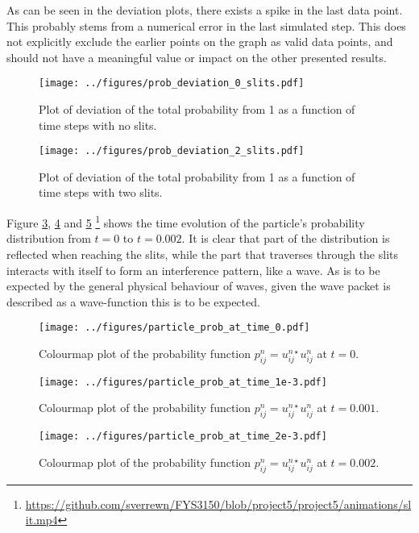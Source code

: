 \documentclass[english,notitlepage,reprint,nofootinbib]{revtex4-1}  %
\begin{document}
	As can be seen in the deviation plots, there exists a spike in the last data point. This probably stems from a numerical error in the last simulated step. This does not explicitly exclude the earlier points on the graph as valid data points, and should not have a meaningful value or impact on the other presented results. 
	\begin{figure}[H]
		\centering
		\texttt{[image: ../figures/prob\_deviation\_0\_slits.pdf]} %
		\caption{Plot of deviation of the total probability from 1 as a function of time steps with no slits.}
		\label{fig:dev_0_slits}
	\end{figure}
	
	\begin{figure}[H]
		\centering
		\texttt{[image: ../figures/prob\_deviation\_2\_slits.pdf]} %
		\caption{Plot of deviation of the total probability from 1 as a function of time steps with two slits.}
		\label{fig:dev_2_slits}
	\end{figure}
	
	Figure \ref{fig:particle_t_0}, \ref{fig:particle_t_1} and \ref{fig:particle_t_2} \footnote{\url{https://github.com/sverrewn/FYS3150/blob/project5/project5/animations/slit.mp4}} shows the time evolution of the particle's probability distribution from $t=0$ to $t=0.002$.
	It is clear that part of the distribution is reflected when reaching the slits, while the part that traverses through the slits interacts with itself to form an interference pattern, like a wave. As is to be expected by the general physical behaviour of waves, given the wave packet is described as a wave-function this is to be expected. 
	\begin{figure}[H]
		\centering
		\texttt{[image: ../figures/particle\_prob\_at\_time\_0.pdf]} %
		\caption{Colourmap plot of the probability function $p^n_{ij}=u^{n\star}_{ij}u^n_{ij}$ at $t=0$.}
		\label{fig:particle_t_0}
	\end{figure}
	
	\begin{figure}[H]
		\centering
		\texttt{[image: ../figures/particle\_prob\_at\_time\_1e-3.pdf]} %
		\caption{Colourmap plot of the probability function $p^n_{ij}=u^{n\star}_{ij}u^n_{ij}$ at $t=0.001$.}
		\label{fig:particle_t_1}
	\end{figure}
	
	\begin{figure}[H]
		\centering
		\texttt{[image: ../figures/particle\_prob\_at\_time\_2e-3.pdf]} %
		\caption{Colourmap plot of the probability function $p^n_{ij}=u^{n\star}_{ij}u^n_{ij}$ at $t=0.002$.}
		\label{fig:particle_t_2}
	\end{figure}
	
\end{document}
